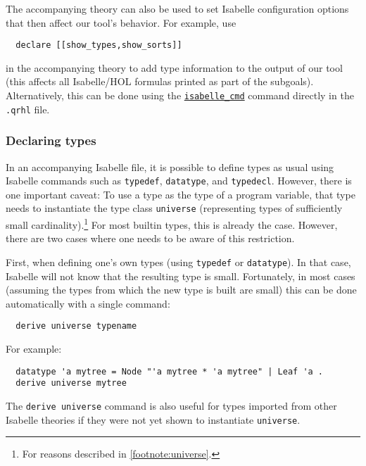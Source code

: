 \documentclass{article}
\begin{document}
The accompanying theory can also be used to set Isabelle configuration
options that then affect our tool's behavior. For example, use
\begin{lstlisting}
  declare [[show_types,show_sorts]]
\end{lstlisting}
in the accompanying theory to
add type information to the output of our tool (this affects all
Isabelle/HOL formulas printed as part of the subgoals).
Alternatively, this can be done using the \hyperref[command:isabelle_cmd]{\texttt{isabelle\_cmd}} command directly in the \texttt{.qrhl} file.

\subsubsection{Declaring types}
\label{sec:deftypes}

In an accompanying Isabelle file, it is possible to define types as
usual using Isabelle commands such as \texttt{typedef},
\texttt{datatype}, and \texttt{typedecl}. However, there is one important
caveat: To use a type as the type of a program variable, that type
needs to instantiate the type class \texttt{universe} (representing
types of sufficiently small cardinality).\footnote{For reasons described in
  \autoref{footnote:universe}.} For most builtin types, this is
already the case. However, there are two cases where one needs to be
aware of this restriction.

First, when defining one's own types (using \texttt{typedef} or
\texttt{datatype}). In that case, Isabelle will not know that the
resulting type is small. Fortunately, in most cases
(assuming the types from which the new type is built are small) this
can be done automatically with a single command:
\begin{lstlisting}
  derive universe typename
\end{lstlisting}
For example:
\begin{lstlisting}
  datatype 'a mytree = Node "'a mytree * 'a mytree" | Leaf 'a .
  derive universe mytree
\end{lstlisting}
The \texttt{derive universe} command is also useful for types imported
from other Isabelle theories if they were not yet shown to instantiate
\texttt{universe}.
\end{document}

